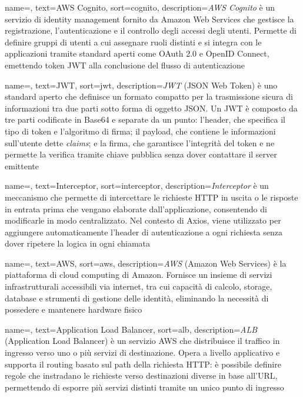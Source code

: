  {
    name=,
    text=AWS Cognito,
    sort=cognito,
    description={\emph{AWS Cognito} è un servizio di identity management fornito da Amazon Web Services che gestisce la registrazione, l'autenticazione e il controllo degli accessi degli utenti. Permette di definire gruppi di utenti a cui assegnare ruoli distinti e si integra con le applicazioni tramite standard aperti come OAuth 2.0 e OpenID Connect, emettendo token JWT alla conclusione del flusso di autenticazione}
}

 {
    name=,
    text=JWT,
    sort=jwt,
    description={\emph{JWT} (JSON Web Token) è uno standard aperto che definisce un formato compatto per la trasmissione sicura di informazioni tra due parti sotto forma di oggetto JSON. Un JWT è composto da tre parti codificate in Base64 e separate da un punto: l'header, che specifica il tipo di token e l'algoritmo di firma; il payload, che contiene le informazioni sull'utente dette \emph{claims}; e la firma, che garantisce l'integrità del token e ne permette la verifica tramite chiave pubblica senza dover contattare il server emittente}
}

 {
    name=,
    text=Interceptor,
    sort=interceptor,
    description={\emph{Interceptor} è un meccanismo che permette di intercettare 
    le richieste HTTP in uscita o le risposte in entrata prima che vengano 
    elaborate dall'applicazione, consentendo di modificarle in modo centralizzato. 
    Nel contesto di Axios, viene utilizzato per aggiungere automaticamente 
    l'header di autenticazione a ogni richiesta senza dover ripetere la logica 
    in ogni chiamata}
}

 {
    name=,
    text=AWS,
    sort=aws,
    description={\emph{AWS} (Amazon Web Services) è la piattaforma di cloud computing di Amazon. Fornisce un insieme di servizi infrastrutturali accessibili via internet, tra cui capacità di calcolo, storage, database e strumenti di gestione delle identità, eliminando la necessità di possedere e mantenere hardware fisico}
}

 {
    name=,
    text=Application Load Balancer,
    sort=alb,
    description={\emph{ALB} (Application Load Balancer) è un servizio AWS che distribuisce il traffico in ingresso verso uno o più servizi di destinazione. Opera a livello applicativo e supporta il routing basato sul path della richiesta HTTP: è possibile definire regole che instradano le richieste verso destinazioni diverse in base all'URL, permettendo di esporre più servizi distinti tramite un unico punto di ingresso}
}

